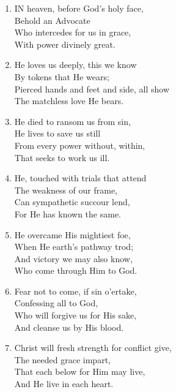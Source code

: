 \documentclass[11pt,a4paper]{article}
\begin{document}
\begin{enumerate}
    \item IN heaven, before God's holy face, \\
            Behold an Advocate \\
        Who intercedes for us in grace, \\
            With power divinely great.

    \item He loves us deeply, this we know \\
            By tokens that He wears; \\
        Pierced hands and feet and side, all show \\
            The matchless love He bears.

    \item He died to ransom us from sin, \\
            He lives to save us still \\
        From every power without, within, \\
            That seeks to work us ill.

    \item He, touched with trials that attend \\
            The weakness of our frame, \\
        Can sympathetic succour lend, \\
            For He has known the same.

    \item He overcame His mightiest foe, \\
            When He earth's pathway trod; \\
        And victory we may also know, \\
            Who come through Him to God.

    \item Fear not to come, if sin o'ertake, \\
            Confessing all to God, \\
        Who will forgive us for His sake, \\
            And cleanse us by His blood.

    \item Christ will fresh strength for conflict give, \\
            The needed grace impart, \\
        That each below for Him may live, \\
            And He live in each heart.

\end{enumerate}
\end{document}
